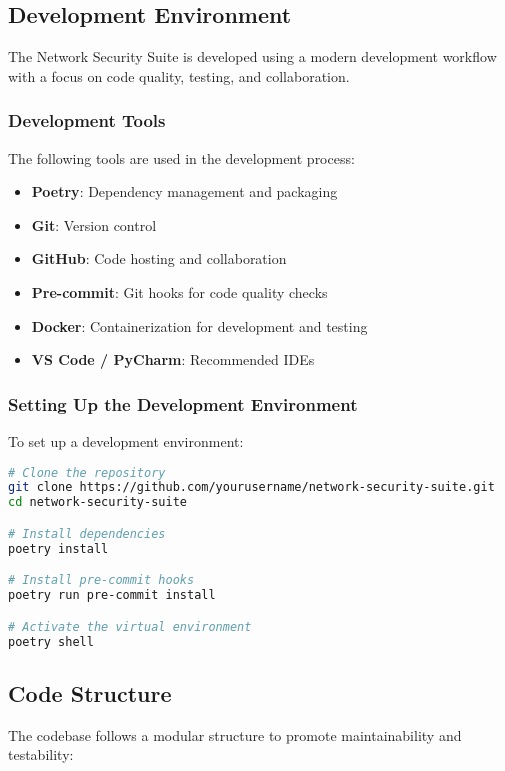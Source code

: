 \subsection{Development Environment}
The Network Security Suite is developed using a modern development workflow with a focus on code quality, testing, and collaboration.

\subsubsection{Development Tools}
The following tools are used in the development process:

\begin{itemize}
    \item \textbf{Poetry}: Dependency management and packaging
    \item \textbf{Git}: Version control
    \item \textbf{GitHub}: Code hosting and collaboration
    \item \textbf{Pre-commit}: Git hooks for code quality checks
    \item \textbf{Docker}: Containerization for development and testing
    \item \textbf{VS Code / PyCharm}: Recommended IDEs
\end{itemize}

\subsubsection{Setting Up the Development Environment}
To set up a development environment:

\begin{lstlisting}[language=bash, caption=Development Environment Setup]
# Clone the repository
git clone https://github.com/yourusername/network-security-suite.git
cd network-security-suite

# Install dependencies
poetry install

# Install pre-commit hooks
poetry run pre-commit install

# Activate the virtual environment
poetry shell
\end{lstlisting}

\subsection{Code Structure}
The codebase follows a modular structure to promote maintainability and testability:

